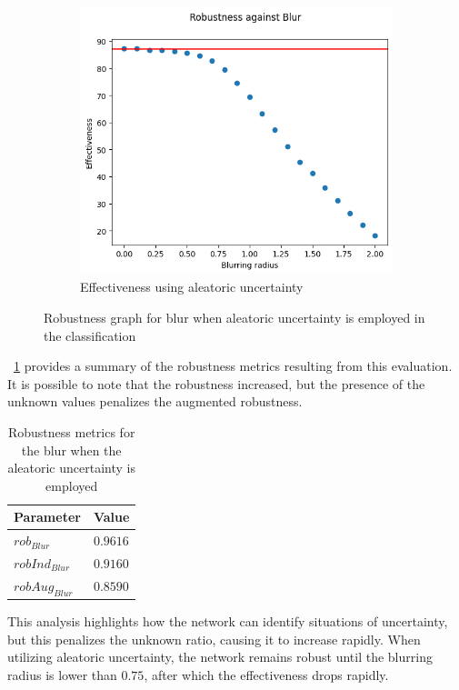 \begin{figure}[h]
\begin{subfigure}{.33\textwidth}
		\centering
		\includegraphics[width=0.9\linewidth]{ImageFiles/EvalBNN/BL/AU/eff}
		\caption{Effectiveness using aleatoric uncertainty}
		\label{fig:bl_au_eff}
	\end{subfigure}
	\caption{Robustness graph for blur when aleatoric uncertainty is employed in the classification}
	\label{fig:bl_au}
\end{figure}

\Tab~\ref{table:rob_bl_au} provides a summary of the robustness metrics resulting from this evaluation. It is possible to note that the robustness increased, but the presence of the unknown values penalizes the augmented robustness.

\begin{table}[h]
	\centering
	\begin{tabular}{|| l | l ||} 
		\hline
		\textbf{Parameter} & \textbf{Value} \\
		\hline
		\hline
		$rob_{Blur}$ & $0.9616$ \\
		$robInd_{Blur}$ & $0.9160$ \\
		$robAug_{Blur}$ & $0.8590$ \\	
		\hline
	\end{tabular}	
	\caption{Robustness metrics for the blur when the aleatoric uncertainty is employed}
	\label{table:rob_bl_au}
\end{table}

This analysis highlights how the network can identify situations of uncertainty, but this penalizes the unknown ratio, causing it to increase rapidly. When utilizing aleatoric uncertainty, the network remains robust until the blurring radius is lower than $0.75$, after which the effectiveness drops rapidly.

